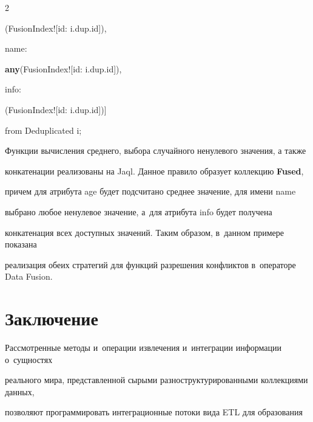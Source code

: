 \begin{multicols}{2}
{    (FusionIndex![id: i.dup.id]),



\noindent

name:



\hspace*{6pt}



\noindent

{\textbf{any}}(FusionIndex![id: i.dup.id]),



\noindent

info:



\noindent

    (FusionIndex![id: i.dup.id])]



\noindent

from Deduplicated i;



}



  Функции вычисления среднего, выбора случайного ненулевого значения, а также

конкатенации реализованы на Jaql. Данное правило образует коллекцию \textbf{Fused},

причем для атрибута {\sf age} будет подсчитано среднее значение, для имени {\sf name}

выбрано любое ненулевое значение, а~для атрибута {\sf info} будет получена

конкатенация всех доступных значений. Таким образом, в~данном примере показана

реализация обеих стратегий для функций разрешения конфликтов в~операторе Data Fusion.



\section{Заключение}



  Рассмотренные методы и~операции извлечения и~интеграции информации о~сущностях

реального мира, представленной сырыми разноструктурированными коллекциями данных,

позволяют программировать интеграционные потоки вида ETL для образования


\end{multicols}
